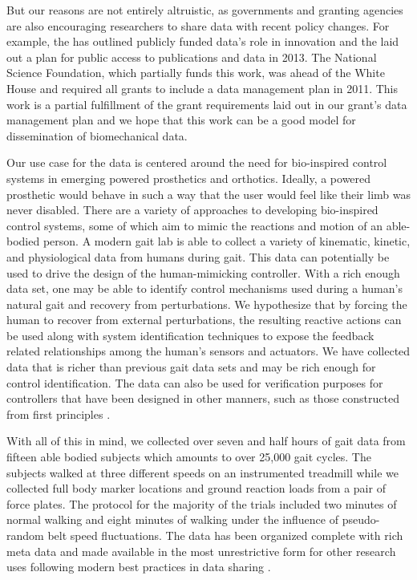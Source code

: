 \documentclass[fleqn,12pt]{wlpeerj}
\begin{document}
But our reasons are not entirely altruistic, as governments and granting
agencies are also encouraging researchers to share data with recent policy
changes. For example, the \cite{EuropeanCommission2012} has outlined publicly
funded data's role in innovation and the \cite{WhiteHouse2013} laid out a plan
for public access to publications and data in 2013. The National Science
Foundation, which partially funds this work, was ahead of the White House and
required all grants to include a data management plan in 2011. This work is a
partial fulfillment of the grant requirements laid out in our grant's data
management plan and we hope that this work can be a good model for
dissemination of biomechanical data.

Our use case for the data is centered around the need for bio-inspired control
systems in emerging powered prosthetics and orthotics. Ideally, a powered
prosthetic would behave in such a way that the user would feel like their limb
was never disabled. There are a variety of approaches to developing
bio-inspired control systems, some of which aim to mimic the reactions and
motion of an able-bodied person. A modern gait lab is able to collect a variety
of kinematic, kinetic, and physiological data from humans during gait. This
data can potentially be used to drive the design of the human-mimicking
controller. With a rich enough data set, one may be able to identify control
mechanisms used during a human's natural gait and recovery from perturbations.
We hypothesize that by forcing the human to recover from external
perturbations, the resulting reactive actions can be used along with system
identification techniques to expose the feedback related relationships among
the human's sensors and actuators. We have collected data that is richer than
previous gait data sets and may be rich enough for control identification. The
data can also be used for verification purposes for controllers that have been
designed in other manners, such as those constructed from first principles
\citep{Geyer2010}.

With all of this in mind, we collected over seven and half hours of gait data
from fifteen able bodied subjects which amounts to over 25,000 gait cycles. The
subjects walked at three different speeds on an instrumented treadmill while we
collected full body marker locations and ground reaction loads from a pair of
force plates. The protocol for the majority of the trials included two minutes
of normal walking and eight minutes of walking under the influence of
pseudo-random belt speed fluctuations. The data has been organized complete
with rich meta data and made available in the most unrestrictive form for other
research uses following modern best practices in data sharing \citep{White2013}.
\end{document}
